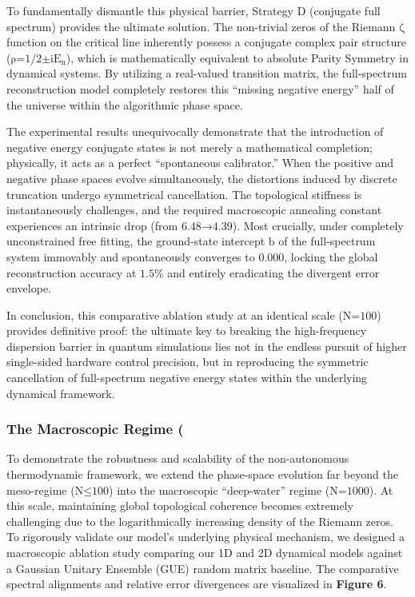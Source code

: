 To fundamentally dismantle this physical barrier, Strategy D (conjugate
full spectrum) provides the ultimate solution. The non-trivial zeros of
the Riemann \(\text{ζ}\) function on the critical line inherently
possess a conjugate complex pair structure
(\(\text{ρ}\text{=1/2±}\text{i}\text{E}_{\text{n}}\)), which is
mathematically equivalent to absolute Parity Symmetry in dynamical
systems. By utilizing a real-valued transition matrix, the full-spectrum
reconstruction model completely restores this ``missing negative
energy'' half of the universe within the algorithmic phase space.

The experimental results unequivocally demonstrate that the introduction
of negative energy conjugate states is not merely a mathematical
completion; physically, it acts as a perfect ``spontaneous calibrator.''
When the positive and negative phase spaces evolve simultaneously, the
distortions induced by discrete truncation undergo symmetrical
cancellation. The topological stiffness is instantaneously challenges,
and the required macroscopic annealing constant experiences an intrinsic
drop (from \(\text{6.48→4.39}\)). Most crucially, under completely
unconstrained free fitting, the ground-state intercept \(\text{b}\) of
the full-spectrum system immovably and spontaneously converges to
\(\text{0.000}\), locking the global reconstruction accuracy at
\(\text{1.5\%}\) and entirely eradicating the divergent error envelope.

In conclusion, this comparative ablation study at an identical scale
(\(\text{N}\text{=100}\)) provides definitive proof: the ultimate key to
breaking the high-frequency dispersion barrier in quantum simulations
lies not in the endless pursuit of higher single-sided hardware control
precision, but in reproducing the symmetric cancellation of
full-spectrum negative energy states within the underlying dynamical
framework.

\subsubsection*{The Macroscopic Regime (}

To demonstrate the robustness and scalability of the non-autonomous
thermodynamic framework, we extend the phase-space evolution far beyond
the meso-regime (\(\text{N}\text{≤100}\)) into the macroscopic
``deep-water'' regime (\(\text{N}\text{=1000}\)). At this scale,
maintaining global topological coherence becomes extremely challenging
due to the logarithmically increasing density of the Riemann zeros. To
rigorously validate our model's underlying physical mechanism, we
designed a macroscopic ablation study comparing our 1D and 2D dynamical
models against a Gaussian Unitary Ensemble (GUE) random matrix baseline.
The comparative spectral alignments and relative error divergences are
visualized in \textbf{Figure 6}.

